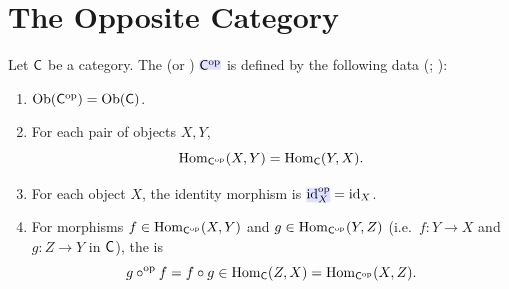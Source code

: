 \documentclass[../preamble]{subfiles}
\begin{document}
\section{The Opposite Category}
\label{sec:opposite}

\begin{definition}
  \label{def:opposite-category}
  Let $\mathsf{C}$ be a category.
  The  (or )
  $\newmath{\Category{C}^{\mathrm{op}}}$ is defined by the following data
  (; ):
  \begin{enumerate}
    \item $\operatorname{Ob}(\mathsf{C}^{\mathrm{op}}) = \operatorname{Ob}(\mathsf{C})$.
    \item For each pair of objects $X, Y$,
      \begin{equation}
        \label{eq:op-hom}
        \operatorname{Hom}_{\mathsf{C}^{\mathrm{op}}}(X, Y)
        = \operatorname{Hom}_{\mathsf{C}}(Y, X).
      \end{equation}
    \item For each object $X$,
      the identity morphism is $\newmath{\id^{\mathrm{op}}_X} = \id_X$.
    \item For morphisms
      $f \in \operatorname{Hom}_{\mathsf{C}^{\mathrm{op}}}(X, Y)$
      and $g \in \operatorname{Hom}_{\mathsf{C}^{\mathrm{op}}}(Y, Z)$
      (i.e.\ $f \colon Y \to X$ and $g \colon Z \to Y$ in $\mathsf{C}$),
      the  is
      \begin{equation}
        \label{eq:op-comp}
        g \circ^{\mathrm{op}} f = f \circ g \in \operatorname{Hom}_{\mathsf{C}}(Z, X)
        = \operatorname{Hom}_{\mathsf{C}^{\mathrm{op}}}(X, Z).
      \end{equation}
  \end{enumerate}
\end{definition}
\end{document}
